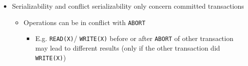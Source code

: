 \begin{itemize}
\begin{itemize}
        \end{itemize}
    \item Serializability and conflict serializability only concern committed transactions
        \begin{itemize}
            \item Operations can be in conflict with \verb+ABORT+
                \begin{itemize}
                    \item E.g. \verb+READ(X)+/ \verb+WRITE(X)+ before or after \verb+ABORT+ of other transaction may lead to different results (only if the other transaction did \verb+WRITE(X)+)
                \end{itemize}
        \end{itemize}
\end{itemize}
